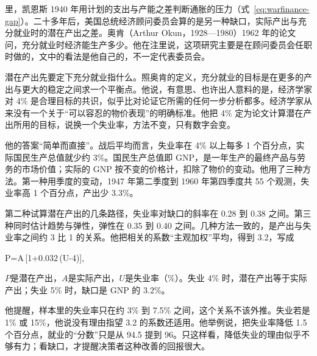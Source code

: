 里，凯恩斯 1940 年用计划的支出与产能之差判断通胀的压力（式~\eqref{eq:warfinance-gap}）。二十多年后，美国总统经济顾问委员会算的是另一种缺口，实际产出与充分就业时的潜在产出之差\cite{erp1962}。奥肯（Arthur Okun，1928—1980）1962 年的论文问，充分就业时经济能生产多少\cite{okun1962,loc38,gnd38}。他在注里说，这项研究主要是在顾问委员会任职时做的，文中的看法是他自己的，不一定代表委员会\cite{okun1962}。

潜在产出先要定下充分就业指什么。照奥肯的定义，充分就业的目标是在更多的产出与更大的稳定之间求一个平衡点\cite{okun1962}。他说，有意思、也许出人意料的是，经济学家对 4\% 是合理目标的共识，似乎比对论证它所需的任何一步分析都多\cite{okun1962}。经济学家从来没有一个关于“可以容忍的物价表现”的明确标准\cite{okun1962}。他把 4\% 定为论文计算潜在产出所用的目标，说换一个失业率，方法不变，只有数字会变\cite{okun1962}。

他的答案“简单而直接”\cite{okun1962}。战后平均而言，失业率在 4\% 以上每多 1 个百分点，实际国民生产总值就少约 3\%\cite{okun1962}。国民生产总值即 GNP，是一年生产的最终产品与劳务的市场价值；实际的 GNP 按不变的价格计，扣除了物价的变动。他用了三种方法\cite{okun1962}。第一种用季度的变动，1947 年第二季度到 1960 年第四季度共 55 个观测，失业率高 1 个百分点，产出少 3.3\%\cite{okun1962}。

第二种试算潜在产出的几条路径，失业率对缺口的斜率在 0.28 到 0.38 之间\cite{okun1962}。第三种同时估计趋势与弹性，弹性在 0.35 到 0.40 之间\cite{okun1962}。几种方法一致的，是产出与失业率之间约 3 比 1 的关系\cite{okun1962}。他把相关的系数“主观加权”平均，得到 3.2，写成
\begin{keyeq}
P=A\,[1+0.032\,(U-4)],\label{eq:phillips-okun}
\end{keyeq}
$P$是潜在产出，$A$是实际产出，$U$是失业率（\%）\cite{okun1962}。失业 4\% 时，潜在产出等于实际产出；失业 5\% 时，缺口是 GNP 的 3.2\%\cite{okun1962}。

他提醒，样本里的失业率只在约 3\% 到 7.5\% 之间，这个关系不该外推\cite{okun1962}。失业若是 1\% 或 15\%，他说没有理由指望 3.2 的系数还适用\cite{okun1962}。他举例说，把失业率降低 1.5 个百分点，就业的“分数”只是从 94.5 提到 96\cite{okun1962}。只这样看，降低失业的理由似乎不够有力；看缺口，才提醒决策者这种改善的回报很大\cite{okun1962}。

